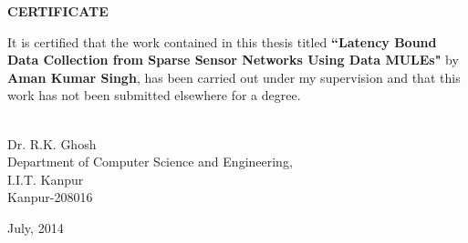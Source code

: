 \setcounter{page}{2}
\vspace*{1.0in}
\begin{center}
\begin{large}
{\bf CERTIFICATE}
\end{large}
\end{center}
\vskip 2cm
It is certified that the work contained in this thesis titled {\bf ``Latency Bound Data Collection from Sparse Sensor Networks Using Data MULEs"} by {\bf Aman Kumar Singh}, has been carried out under my supervision and that this work has not been submitted elsewhere for a degree.
\vskip 1in
\begin{flushleft}
		\hspace*{5cm}{\hrulefill}\\
		\hspace*{5cm}Dr. R.K. Ghosh\\
		\hspace*{5cm}Department of Computer Science and Engineering,\\ 
		\hspace*{5cm}I.I.T. Kanpur\\
		\hspace*{5cm}Kanpur-208016
\end{flushleft}
July, 2014
\pagebreak